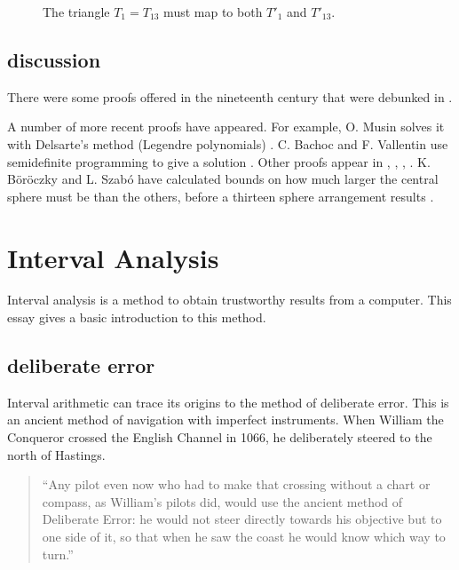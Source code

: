 \begin{figure}[htb]
  \centering
  \caption{The triangle $T_1=T_{13}$ must map to both $T'_1$ and $T'_{13}$.}
  \label{fig:th:D}
\end{figure}


\subsection{discussion}



There were some proofs offered in the nineteenth century that were debunked in \cite{Hal94}.

A number of more recent proofs have appeared.  For example, O. Musin solves it
with Delsarte's method (Legendre polynomials) \cite{Mus06}.  C. Bachoc and F. Vallentin use semidefinite
programming to give a solution \cite{BV06}.  Other proofs appear in 
\cite{Mae01}, \cite{Ans02},  \cite{Bor03}, \cite{Mae07}.   K. B\"or\"oczky and L. Szab\'o have calculated
bounds on how much larger the central sphere must be than the others, before a thirteen sphere
arrangement results \cite{BoSz03}.  

\clearpage
\section{Interval Analysis}%
\label{sec:bounds-simplex}

Interval analysis is a method to obtain trustworthy results from a computer.
This essay gives a basic introduction to this method.

\subsection{deliberate error}

Interval arithmetic can trace its origins to the method of deliberate error.
This is an ancient method of navigation with imperfect instruments.  When William
the Conqueror
crossed the English Channel in 1066, he deliberately steered to the north of Hastings.

\begin{quote}
``Any pilot even now who had to make that crossing without a chart or compass,
as William's pilots did, would use the ancient method of Deliberate Error: he would
not steer directly towards his objective but to one side of it, so that when he
saw the coast he would know which way to turn.'' \cite[p81]{How81}
\end{quote}

